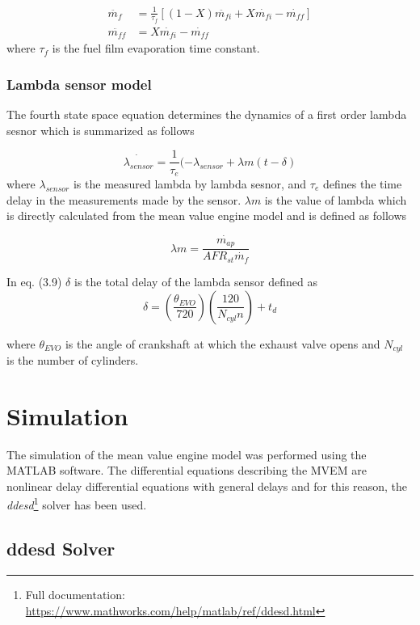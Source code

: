 \begin{align}
\ddot{m_{f}}&=\frac{1}{\tau _{f}}[(1-X)\ddot{m_{fi}}+X\dot{m_{fi}}-\dot{m_{ff}}]
\\
\ddot{m_{ff}}&=X\dot{m_{fi}}-\dot{m_{ff}}
\end{align}
where $\tau _{f}$ is the fuel film evaporation time constant.


\subsubsection{Lambda sensor model}

The fourth state space equation determines the dynamics of a first order lambda sesnor which is summarized as follows \cite{lambdacontrol}

\begin{equation}
\dot{\lambda _{sensor}}=\frac{1}{\tau _{e}}(- \lambda _{sensor} + \lambda{m} (t -\delta)
\end{equation}
where $\lambda _{sensor}$ is the measured lambda by lambda sesnor, and $\tau _{e}$ defines the time delay in the measurements made by the sensor. $\lambda{m}$ is the value of lambda which is directly calculated from the mean value engine model and is defined as follows

\begin{equation}
\lambda{m}=\frac{\dot{m_{ap}}}{AFR_{st}\dot{m_{f}}}
\end{equation} 

In eq. (3.9) $\delta$ is the total delay of the lambda sensor defined as
\begin{equation}
\delta=(\frac{\theta _{EVO}}{720})(\frac{120}{N_{cyl}n})+t_{d}
\end{equation}

where $\theta _{EVO}$ is the angle of crankshaft at which the exhaust valve opens and $N_{cyl}$ is the number of cylinders.
 
\section{Simulation}

The simulation of the mean value engine model was performed using the MATLAB software. The differential equations describing the MVEM are nonlinear delay differential equations with general delays and for this reason, the \textit{ddesd}\footnote{Full documentation: \url{https://www.mathworks.com/help/matlab/ref/ddesd.html}} solver has been used.

\subsection{ddesd Solver}

